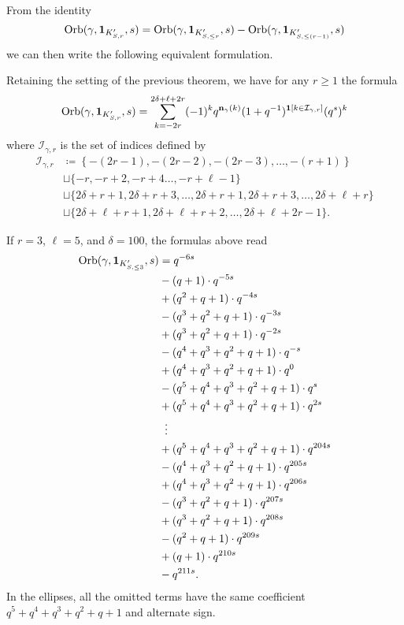 From the identity
\[
  \operatorname{Orb}(\gamma, \mathbf{1}_{K'_{S, r}}, s)
  = \operatorname{Orb}(\gamma, \mathbf{1}_{K'_{S, \le r}}, s)
  - \operatorname{Orb}(\gamma, \mathbf{1}_{K'_{S, \le (r-1)}}, s)
\]
we can then write the following equivalent formulation.
\begin{theorem}
  Retaining the setting of the previous theorem, we have for any $r \ge 1$ the formula
  \[
    \operatorname{Orb}(\gamma, \mathbf{1}_{K'_{S, r}}, s)
    = \sum_{k = -2r}^{2\delta + \ell + 2r}
    (-1)^k q^{\mathbf n_{\gamma}(k)}
    (1+q^{-1})^{\mathbf{1}[k \in \mathcal I_{\gamma, r}]}
    (q^s)^k
  \]
  where $\mathcal I_{\gamma, r}$ is the set of indices defined by
  \begin{align*}
    \mathcal{I}_{\gamma, r}
    &\coloneqq \left\{ -(2r-1), -(2r-2), -(2r-3), \dots, -(r+1) \right\} \\
    &\sqcup \{-r, -r+2, -r+4 \dots, -r+\ell-1 \} \\
    &\sqcup \{ 2\delta+r+1, 2\delta+r+3, \dots, 2\delta+r+1, 2\delta+r+3, \dots, 2\delta+\ell+r \} \\
    &\sqcup \{ 2\delta+\ell+r+1, 2\delta+\ell+r+2, \dots, 2\delta+\ell+2r-1 \}.
  \end{align*}
\end{theorem}

\begin{example}
  If $r=3$, $\ell=5$, and $\delta=100$, the formulas above read
  \begin{align*}
  \Orb(\gamma, \mathbf{1}_{K'_{S, \le 3}}, s)
  &= q^{-6s} \\
  &- (q+1) \cdot q^{-5s} \\
  &+ (q^2+q+1) \cdot q^{-4s} \\
  &- (q^3+q^2+q+1) \cdot q^{-3s} \\
  &+ (q^3+q^2+q+1) \cdot q^{-2s} \\
  &- (q^4+q^3+q^2+q+1) \cdot q^{-s} \\
  &+ (q^4+q^3+q^2+q+1) \cdot q^{0} \\
  &- (q^5+q^4+q^3+q^2+q+1) \cdot q^{s} \\
  &+ (q^5+q^4+q^3+q^2+q+1) \cdot q^{2s} \\
  &\vdotswithin= \\
  &+ (q^5+q^4+q^3+q^2+q+1) \cdot q^{204s} \\
  &- (q^4+q^3+q^2+q+1) \cdot q^{205s} \\
  &+ (q^4+q^3+q^2+q+1) \cdot q^{206s} \\
  &- (q^3+q^2+q+1) \cdot q^{207s} \\
  &+ (q^3+q^2+q+1) \cdot q^{208s} \\
  &- (q^2+q+1) \cdot q^{209s} \\
  &+ (q+1) \cdot q^{210s} \\
  &- q^{211s}.
  \end{align*}
  In the ellipses, all the omitted terms
  have the same coefficient $q^5+q^4+q^3+q^2+q+1$
  and alternate sign.
\end{example}

